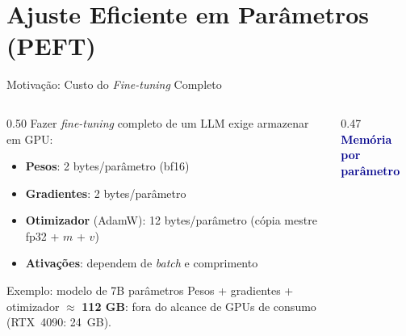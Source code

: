 \documentclass[aspectratio=169, xcolor=dvipsnames]{beamer}
\begin{document}
  \section{Ajuste Eficiente em Parâmetros (PEFT)}

  \begin{frame}{Motivação: Custo do \textit{Fine-tuning} Completo}
    \begin{columns}[T]
      \begin{column}{0.50\textwidth}
        Fazer \textit{fine-tuning} completo de um LLM exige armazenar em GPU:
        \begin{itemize}
          \item \textbf{Pesos}: 2 bytes/parâmetro (bf16)
          \item \textbf{Gradientes}: 2 bytes/parâmetro
          \item \textbf{Otimizador} (AdamW): 12 bytes/parâmetro (cópia mestre fp32 + $m$ + $v$)
          \item \textbf{Ativações}: dependem de \textit{batch} e comprimento
        \end{itemize}

        \vspace{-0.2em}
        \begin{alertblock}{Exemplo: modelo de 7B parâmetros}
          Pesos + gradientes + otimizador $\approx$ \textbf{112 GB}:
          fora do alcance de GPUs de consumo (RTX~4090: 24~GB).
        \end{alertblock}
      \end{column}
      \begin{column}{0.47\textwidth}
        \textcolor{DarkBlue}{\textbf{Memória por parâmetro}}



\end{column}
\end{columns}
\end{frame}
\end{document}
